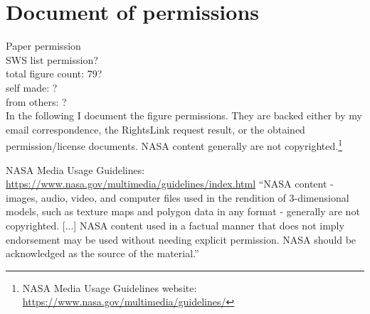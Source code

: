 
\chapter*{Document of permissions}

Paper permission\\

SWS list permission?\\

total figure count: 79?\\
self made: ?\\
from others: ?\\

In the following I document the figure permissions. They are backed either by my email correspondence, the RightsLink request result, or the obtained permission/license documents. NASA content generally are not copyrighted.\footnote{NASA Media Usage Guidelines website: \url{https://www.nasa.gov/multimedia/guidelines/}}

NASA Media Usage Guidelines:\\
\url{https://www.nasa.gov/multimedia/guidelines/index.html}
``NASA content - images, audio, video, and computer files used in the rendition of 3-dimensional models, such as texture maps and polygon data in any format - generally are not copyrighted. [...] NASA content used in a factual manner that does not imply endorsement may be used without needing explicit permission. NASA should be acknowledged as the source of the material.''\\


\renewcommand\listfigurename{List of figures and their permissions}
\lofimagetrue
\listoffigures



